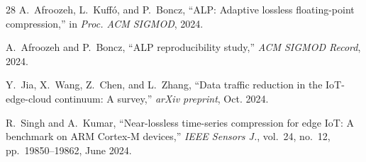 \documentclass[runningheads]{llncs}
\begin{document}
\begin{thebibliography}{28}
A.~Afroozeh, L.~Kuff\'{o}, and P.~Boncz, ``ALP: Adaptive lossless floating-point compression,'' in \emph{Proc. ACM SIGMOD}, 2024.

A.~Afroozeh and P.~Boncz, ``ALP reproducibility study,'' \emph{ACM SIGMOD Record}, 2024.

Y.~Jia, X.~Wang, Z.~Chen, and L.~Zhang, ``Data traffic reduction in the IoT-edge-cloud continuum: A survey,'' \emph{arXiv preprint}, Oct. 2024.

R.~Singh and A.~Kumar, ``Near-lossless time-series compression for edge IoT: A benchmark on ARM Cortex-M devices,'' \emph{IEEE Sensors J.}, vol.~24, no.~12, pp.~19850--19862, June 2024.

\end{thebibliography}
\end{document}
